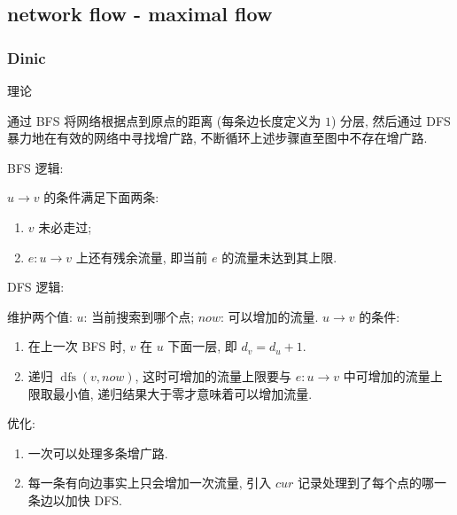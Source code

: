 \documentclass[UTF8, a4paper, titlepage, twoside]{ctexart}
\begin{document}
\subsection{ network flow - maximal flow }
\subsubsection*{ Dinic }
理论

通过 BFS 将网络根据点到原点的距离 (每条边长度定义为 \(1\)) 分层, 然后通过 DFS 暴力地在有效的网络中寻找增广路, 不断循环上述步骤直至图中不存在增广路.

BFS 逻辑:

\(u \to v\) 的条件满足下面两条:
\begin{enumerate}
	\item \(v\) 未必走过;
	\item \(e: u \to v\) 上还有残余流量, 即当前 \(e\) 的流量未达到其上限.
\end{enumerate}

DFS 逻辑:

维护两个值: \(u\): 当前搜索到哪个点; \(now\): 可以增加的流量. \(u \to v\) 的条件:

\begin{enumerate}
	\item 在上一次 BFS 时, \(v\) 在 \(u\) 下面一层, 即 \(d_v = d_u + 1\).
	\item 递归 \(\operatorname{dfs}(v, now)\), 这时可增加的流量上限要与 \(e: u \to v\) 中可增加的流量上限取最小值, 递归结果大于零才意味着可以增加流量.
\end{enumerate}

优化:
\begin{enumerate}
	\item 一次可以处理多条增广路.
	\item 每一条有向边事实上只会增加一次流量, 引入 \(cur\) 记录处理到了每个点的哪一条边以加快 DFS.
\end{enumerate}
\end{document}
